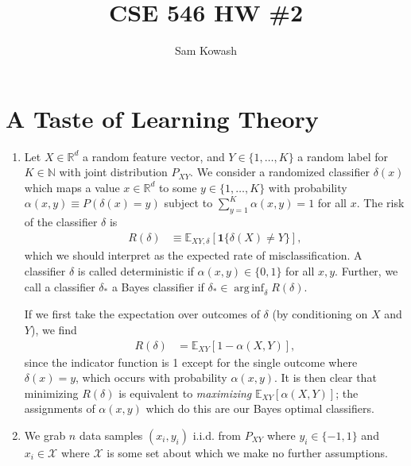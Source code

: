 \documentclass[11pt,letterpaper]{article}
\author{Sam Kowash}
\title{CSE 546 HW \#2}
\DeclareMathOperator*{\arginf}{arg\,inf}
\numberwithin{equation}{section}
\numberwithin{figure}{section}
\begin{document}
\maketitle
\section{A Taste of Learning Theory}
\begin{enumerate}
	\item Let $X \in \mathbb{R}^d$ a random feature vector, and $Y \in \{1,\ldots,K\}$ a random label for $K\in \mathbb{N}$ with joint distribution $P_{XY}$. We consider a randomized classifier $\delta(x)$ which maps a value $x\in\mathbb{R}^d$ to some $y \in \{1,\ldots,K\}$ with probability $\alpha(x,y) \equiv P(\delta(x)=y)$ subject to $\sum_{y=1}^K \alpha(x,y) = 1$ for all $x$. The risk of the classifier $\delta$ is
	\begin{align*}
		R(\delta) &\equiv \mathbb{E}_{XY,\delta}\left[\bm{1}\{\delta(X) \neq Y\}\right],
	\end{align*}
	which we should interpret as the expected rate of misclassification. A classifier $\delta$ is called deterministic if $\alpha(x,y) \in \{0,1\}$ for all $x,y$. Further, we call a classifier $\delta_\ast$ a Bayes classifier if $\delta_\ast \in \arginf_\delta R(\delta)$.

	If we first take the expectation over outcomes of $\delta$ (by conditioning on $X$ and $Y$), we find
	\begin{align*}
		R(\delta) &= \mathbb{E}_{XY}\left[1-\alpha(X,Y)\right],
	\end{align*}
	since the indicator function is 1 except for the single outcome where $\delta(x)=y$, which occurs with probability $\alpha(x,y)$. It is then clear that minimizing $R(\delta)$ is equivalent to \emph{maximizing} $\mathbb{E}_{XY}[\alpha(X,Y)]$; the assignments of $\alpha(x,y)$ which do this are our Bayes optimal classifiers. 












	\item We grab $n$ data samples $(x_i,y_i)$ i.i.d. from $P_{XY}$ where $y_i \in \{-1,1\}$ and $x_i \in \mathcal{X}$ where $\mathcal{X}$ is some set about which we make no further assumptions. 
\end{enumerate}
\end{document}
